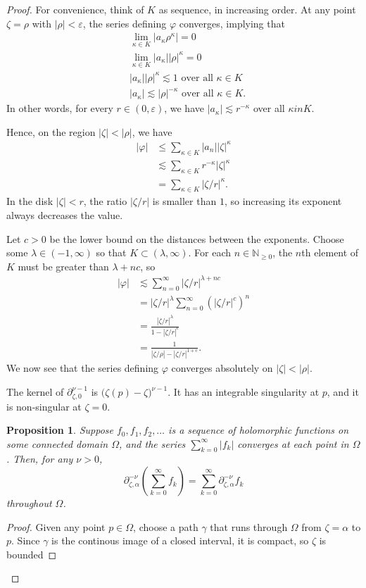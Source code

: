 \documentclass{article}
\theoremstyle{definition}
\theoremstyle{plain}
\newtheorem{prop}[definition]{Proposition}
\newenvironment{verify}{\color{ForestGreen}}{\color{black}}
\newenvironment{old}{\color{RoyalBlue}}{\color{black}}
\begin{document}
\begin{proof}
\begin{old}
\begin{verify}
For convenience, think of $K$ as sequence, in increasing order. At any point $\zeta = \rho$ with $|\rho| < \varepsilon$, the series defining $\varphi$ converges, implying that
\begin{align*}
& \lim_{\kappa \in K} |a_\kappa \rho^\kappa| = 0 \\
& \lim_{\kappa \in K} |a_\kappa| |\rho|^\kappa = 0 \\
& |a_\kappa| |\rho|^\kappa \lesssim 1 \text{ over all } \kappa \in K \\
& |a_\kappa| \lesssim |\rho|^{-\kappa} \text{ over all } \kappa \in K.
\end{align*}
In other words, for every $r \in (0, \varepsilon)$, we have $|a_\kappa| \lesssim r^{-\kappa}$ over all $\kappa in K$.

Hence, on the region $|\zeta| < |\rho|$, we have
\begin{align*}
|\varphi| & \le \sum_{\kappa \in K} |a_n| |\zeta|^\kappa \\
& \lesssim \sum_{\kappa \in K} r^{-\kappa} |\zeta|^\kappa \\
& = \sum_{\kappa \in K} |\zeta/r|^\kappa.
\end{align*}
In the disk $|\zeta| < r$, the ratio $|\zeta/r|$ is smaller than $1$, so increasing its exponent always decreases the value.

Let $c > 0$ be the lower bound on the distances between the exponents. Choose some $\lambda \in (-1, \infty)$ so that $K \subset (\lambda, \infty)$. For each $n \in \mathbb{N}_{\ge 0}$, the $n$th element of $K$ must be greater than $\lambda + nc$, so
\begin{align*}
|\varphi| & \lesssim \sum_{n = 0}^\infty |\zeta/r|^{\lambda + nc} \\
& = |\zeta/r|^\lambda \sum_{n = 0}^\infty (|\zeta/r|^c)^n \\
& = \frac{|\zeta/r|^\lambda}{1 - |\zeta/r|^c} \\
& = \frac{1}{|\zeta/\rho| - |\zeta/r|^{1+c}}.
\end{align*}
We now see that the series defining $\varphi$ converges absolutely on $|\zeta| < |\rho|$.

The kernel of $\partial_{\zeta, 0}^{\nu-1}$ is $\big(\zeta(p) - \zeta\big)^{\nu-1}$. It has an integrable singularity at $p$, and it is non-singular at $\zeta = 0$.
\end{verify}

\begin{prop}
Suppose $f_0, f_1, f_2, \ldots$ is a sequence of holomorphic functions on some connected domain $\Omega$, and the series $\sum_{k=0}^\infty |f_k|$ converges at each point in $\Omega$. Then, for any $\nu > 0$,
\[ \partial_{\zeta, \alpha}^{-\nu} \left( \sum_{k=0}^\infty f_k \right) = \sum_{k=0}^\infty \partial_{\zeta, \alpha}^{-\nu} f_k \]
throughout $\Omega$.
\end{prop}
\begin{proof}
Given any point $p \in \Omega$, choose a path $\gamma$ that runs through $\Omega$ from $\zeta = \alpha$ to $p$. Since $\gamma$ is the continous image of a closed interval, it is compact, so $\zeta$ is bounded


\end{proof}
\end{old}
\end{proof}
\end{document}
